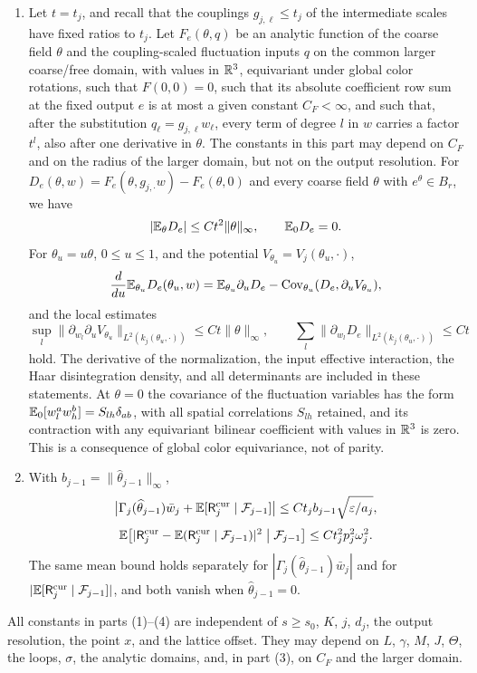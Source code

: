 \begin{theorem}
\begin{enumerate}
\[\]
where $\ell^2$ and $\ell^\infty$ refer to the counting norms on the fluctuation variables.
\item Let $t=t_j$, and recall that the couplings $g_{j,\ell}\le t_j$ of the intermediate scales have fixed ratios to $t_j$. Let $F_e(\theta,q)$ be an analytic function of the coarse field $\theta$ and the coupling-scaled fluctuation inputs $q$ on the common larger coarse/free domain, with values in $\mathbb R^3$, equivariant under global color rotations, such that $F(0,0)=0$, such that its absolute coefficient row sum at the fixed output $e$ is at most a given constant $C_F<\infty$, and such that, after the substitution $q_\ell=g_{j,\ell}w_\ell$, every term of degree $l$ in $w$ carries a factor $t^l$, also after one derivative in $\theta$. The constants in this part may depend on $C_F$ and on the radius of the larger domain, but not on the output resolution. For $D_e(\theta,w)=F_e(\theta,g_{j,\cdot}w)-F_e(\theta,0)$ and every coarse field $\theta$ with $e^\theta\in B_r$, we have
\[
 |\mathbb E_\theta D_e|\le Ct^2\|\theta\|_\infty,\qquad \mathbb E_0D_e=0.
\]
For $\theta_u=u\theta$, $0\le u\le1$, and the potential $V_{\theta_u}=V_j(\theta_u,\cdot)$,
\[
 \frac d{du}\mathbb E_{\theta_u}D_e(\theta_u,w)=\mathbb E_{\theta_u}\partial_uD_e-\operatorname{Cov}_{\theta_u}(D_e,\partial_uV_{\theta_u}),
\]
and the local estimates
\[
 \sup_l\|\partial_{w_l}\partial_uV_{\theta_u}\|_{L^2(k_j(\theta_u,\cdot))}\le Ct\|\theta\|_\infty,\qquad \sum_l\|\partial_{w_l}D_e\|_{L^2(k_j(\theta_u,\cdot))}\le Ct
\]
hold. The derivative of the normalization, the input effective interaction, the Haar disintegration density, and all determinants are included in these statements. At $\theta=0$ the covariance of the fluctuation variables has the form $\mathbb E_0[w_l^aw_h^b]=S_{lh}\delta_{ab}$, with all spatial correlations $S_{lh}$ retained, and its contraction with any equivariant bilinear coefficient with values in $\mathbb R^3$ is zero. This is a consequence of global color equivariance, not of parity.
\item With $b_{j-1}=\|\widehat\theta_{j-1}\|_\infty$,
\[
 \bigl|\Gamma_j(\widehat\theta_{j-1})\bar w_j+\mathbb E[\mathsf R_j^{\rm cur}\mid\mathcal F_{j-1}]\bigr|\le Ct_jb_{j-1}\sqrt{\varepsilon/a_j},
\]
\[
 \mathbb E\bigl[|\mathsf R_j^{\rm cur}-\mathbb E(\mathsf R_j^{\rm cur}\mid\mathcal F_{j-1})|^2\bigm|\mathcal F_{j-1}\bigr]\le Ct_j^2p_j^2\omega_j^2.
\]
The same mean bound holds separately for $|\Gamma_j(\widehat\theta_{j-1})\bar w_j|$ and for $|\mathbb E[\mathsf R_j^{\rm cur}\mid\mathcal F_{j-1}]|$, and both vanish when $\widehat\theta_{j-1}=0$.
\end{enumerate}
All constants in parts (1)--(4) are independent of $s\ge s_0$, $K$, $j$, $d_j$, the output resolution, the point $x$, and the lattice offset. They may depend on $L$, $\gamma$, $M$, $J$, $\Theta$, the loops, $\sigma$, the analytic domains, and, in part (3), on $C_F$ and the larger domain.
\end{theorem}

